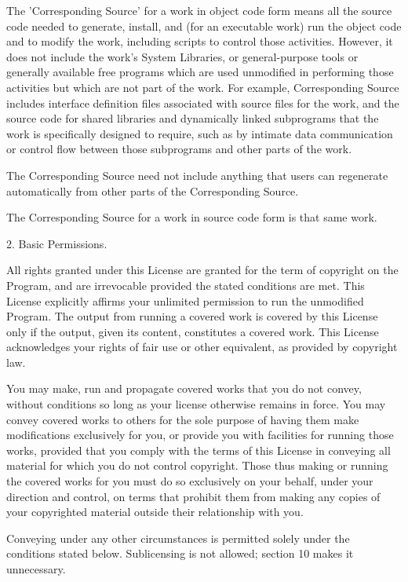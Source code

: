 \documentclass{article}
\begin{document}
  The 'Corresponding Source' for a work in object code form means all
the source code needed to generate, install, and (for an executable
work) run the object code and to modify the work, including scripts to
control those activities.  However, it does not include the work's
System Libraries, or general-purpose tools or generally available free
programs which are used unmodified in performing those activities but
which are not part of the work.  For example, Corresponding Source
includes interface definition files associated with source files for
the work, and the source code for shared libraries and dynamically
linked subprograms that the work is specifically designed to require,
such as by intimate data communication or control flow between those
subprograms and other parts of the work.

  The Corresponding Source need not include anything that users
can regenerate automatically from other parts of the Corresponding
Source.

  The Corresponding Source for a work in source code form is that
same work.

  2. Basic Permissions.

  All rights granted under this License are granted for the term of
copyright on the Program, and are irrevocable provided the stated
conditions are met.  This License explicitly affirms your unlimited
permission to run the unmodified Program.  The output from running a
covered work is covered by this License only if the output, given its
content, constitutes a covered work.  This License acknowledges your
rights of fair use or other equivalent, as provided by copyright law.

  You may make, run and propagate covered works that you do not
convey, without conditions so long as your license otherwise remains
in force.  You may convey covered works to others for the sole purpose
of having them make modifications exclusively for you, or provide you
with facilities for running those works, provided that you comply with
the terms of this License in conveying all material for which you do
not control copyright.  Those thus making or running the covered works
for you must do so exclusively on your behalf, under your direction
and control, on terms that prohibit them from making any copies of
your copyrighted material outside their relationship with you.

  Conveying under any other circumstances is permitted solely under
the conditions stated below.  Sublicensing is not allowed; section 10
makes it unnecessary.
\end{document}
